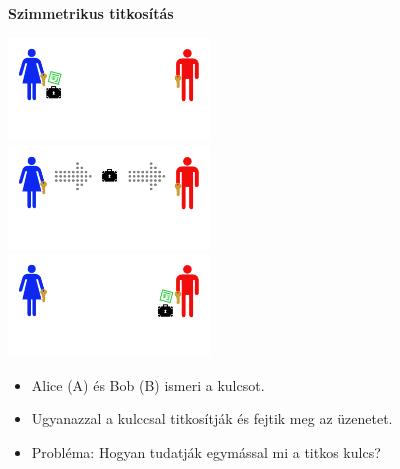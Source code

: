\documentclass{beamer}
\begin{document}
    \begin{frame}

        \center

        \textbf{Szimmetrikus titkosítás}

        \hspace{5pt}

        \includegraphics[trim={0 50px 0 15px},clip,width=0.4\textwidth]{shared1.png}\\
        \includegraphics[trim={0 50px 0 15px},clip,width=0.4\textwidth]{shared2.png}\\
        \includegraphics[trim={0 50px 0 15px},clip,width=0.4\textwidth]{shared3.png}

        \begin{itemize}
            \item Alice (A) és Bob (B) ismeri a kulcsot.
            \item Ugyanazzal a kulccsal titkosítják és fejtik meg az üzenetet.
            \item Probléma: Hogyan tudatják egymással mi a titkos kulcs?
        \end{itemize}

    \end{frame}
\end{document}
